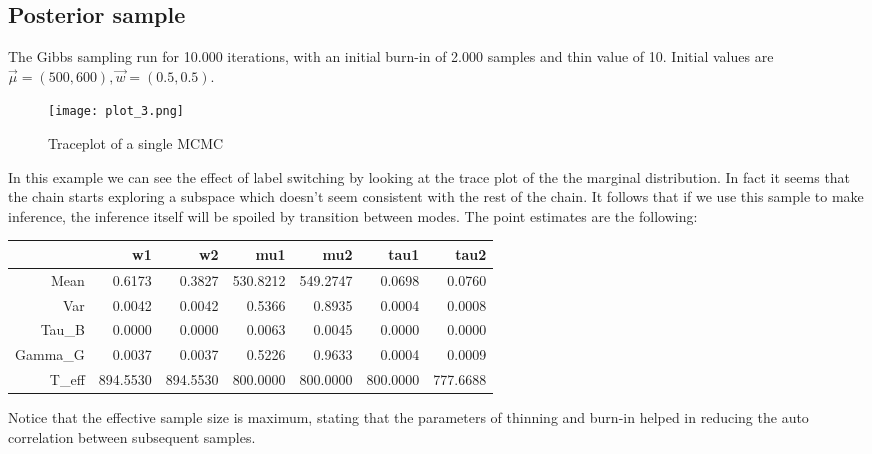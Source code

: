 \documentclass{article}
\begin{document}
\subsection{Posterior sample}
The Gibbs sampling run for 10.000 iterations, with an initial burn-in of 2.000 samples and thin value of 10. Initial values are $\vec \mu = (500, 600), \vec w = (0.5,0.5)$. 

\begin{figure}[h!]
    \centering
    \texttt{[image: plot\_3.png]}
    \caption{Traceplot of a single MCMC}
    \label{Monkey measurement}
\end{figure}

In this example we can see the effect of label switching by looking at the trace plot of the the marginal distribution. In fact it seems that the chain starts exploring a subspace which doesn't seem consistent with the rest of the chain. It follows that if we use this sample to make inference, the inference itself will be spoiled by transition between modes. The point estimates are the following:

\begin{table}[ht]
\centering
\begin{tabular}{rrrrrrr}
  \hline
 & w1 & w2 & mu1 & mu2 & tau1 & tau2 \\ 
  \hline
Mean & 0.6173 & 0.3827 & 530.8212 & 549.2747 & 0.0698 & 0.0760 \\ 
  Var & 0.0042 & 0.0042 & 0.5366 & 0.8935 & 0.0004 & 0.0008 \\ 
  Tau\_B & 0.0000 & 0.0000 & 0.0063 & 0.0045 & 0.0000 & 0.0000 \\ 
  Gamma\_G & 0.0037 & 0.0037 & 0.5226 & 0.9633 & 0.0004 & 0.0009 \\ 
  T\_eff & 894.5530 & 894.5530 & 800.0000 & 800.0000 & 800.0000 & 777.6688 \\ 
   \hline
\end{tabular}
\end{table}

Notice that the effective sample size is maximum, stating that the parameters of thinning and burn-in helped in reducing the auto correlation between subsequent samples.
\end{document}
